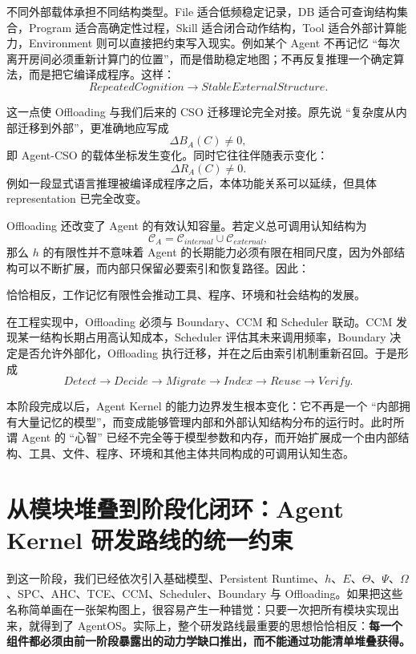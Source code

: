 不同外部载体承担不同结构类型。File 适合低频稳定记录，DB 适合可查询结构集合，Program 适合高确定性过程，Skill 适合闭合动作结构，Tool 适合外部计算能力，Environment 则可以直接把约束写入现实。例如某个 Agent 不再记忆 ``每次离开房间必须重新计算门的位置''，而是借助稳定地图；不再反复推理一个确定算法，而是把它编译成程序。这样：
\[
RepeatedCognition
\rightarrow
StableExternalStructure.
\]

这一点使 Offloading 与我们后来的 CSO 迁移理论完全对接。原先说 ``复杂度从内部迁移到外部''，更准确地应写成
\[
\Delta B_A(C)\neq 0,
\]
即 Agent-CSO 的载体坐标发生变化。同时它往往伴随表示变化：
\[
\Delta R_A(C)\neq 0.
\]
例如一段显式语言推理被编译成程序之后，本体功能关系可以延续，但具体 representation 已完全改变。

Offloading 还改变了 Agent 的有效认知容量。若定义总可调用认知结构为
\[
\mathcal C_A
=
\mathcal C_{internal}
\cup
\mathcal C_{external},
\]
那么 $h$ 的有限性并不意味着 Agent 的长期能力必须有限在相同尺度，因为外部结构可以不断扩展，而内部只保留必要索引和恢复路径。因此：
\begin{statementbox}
\centering
{}
\end{statementbox}
恰恰相反，工作记忆有限性会推动工具、程序、环境和社会结构的发展。

在工程实现中，Offloading 必须与 Boundary、CCM 和 Scheduler 联动。CCM 发现某一结构长期占用高认知成本，Scheduler 评估其未来调用频率，Boundary 决定是否允许外部化，Offloading 执行迁移，并在之后由索引机制重新召回。于是形成
\[
Detect
\rightarrow
Decide
\rightarrow
Migrate
\rightarrow
Index
\rightarrow
Reuse
\rightarrow
Verify.
\]

本阶段完成以后，Agent Kernel 的能力边界发生根本变化：它不再是一个 ``内部拥有大量记忆的模型''，而变成能够管理内部和外部认知结构分布的运行时。此时所谓 Agent 的 ``心智'' 已经不完全等于模型参数和内存，而开始扩展成一个由内部结构、工具、文件、程序、环境和其他主体共同构成的可调用认知生态。

\section{从模块堆叠到阶段化闭环：Agent Kernel 研发路线的统一约束}

到这一阶段，我们已经依次引入基础模型、Persistent Runtime、$h$、$E$、$\Theta$、$\Psi$、$\Omega$、SPC、AHC、TCE、CCM、Scheduler、Boundary 与 Offloading。如果把这些名称简单画在一张架构图上，很容易产生一种错觉：只要一次把所有模块实现出来，就得到了 AgentOS。实际上，整个研发路线最重要的思想恰恰相反：\textbf{每一个组件都必须由前一阶段暴露出的动力学缺口推出，而不能通过功能清单堆叠获得。}

